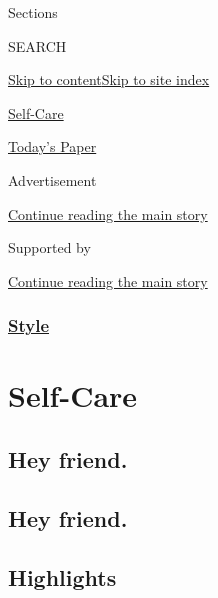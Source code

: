 Sections

SEARCH

\protect\hyperlink{site-content}{Skip to
content}\protect\hyperlink{site-index}{Skip to site index}

\href{https://www.nytimes3xbfgragh.onion/section/style/self-care/}{Self-Care}

\href{https://myaccount.nytimes3xbfgragh.onion/auth/login?response_type=cookie\&client_id=vi}{}

\href{https://www.nytimes3xbfgragh.onion/section/todayspaper}{Today's
Paper}

Advertisement

\protect\hyperlink{after-top}{Continue reading the main story}

Supported by

\protect\hyperlink{after-sponsor}{Continue reading the main story}

\hypertarget{style}{%
\subsubsection{\texorpdfstring{\href{/section/style}{Style}}{Style}}\label{style}}

\hypertarget{self-care}{%
\section{Self-Care}\label{self-care}}

\hypertarget{hey-friend}{%
\subsection{Hey friend.}\label{hey-friend}}

\hypertarget{hey-friend-1}{%
\subsection{Hey friend.}\label{hey-friend-1}}

\hypertarget{highlights}{%
\subsection{Highlights}\label{highlights}}

